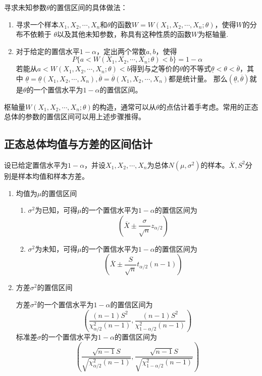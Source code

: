 \begin{theorem}
    寻求未知参数$\theta$的置信区间的具体做法：
    \begin{enumerate}[1°]
        \item 寻求一个样本$X_1,X_2,\cdots,X_n$和$\theta$的函数$W=W(X_1,X_2,\cdots,X_n;\theta)$，使得$W$的分布不依赖于
        $\theta$以及其他未知参数，称具有这种性质的函数$W$为{\heiti 枢轴量}.
        \item 对于给定的置信水平$1-\alpha$，定出两个常数$a,b$，使得
        $$P\{a<W(X_1,X_2,\cdots,X_n;\theta)<b\}=1-\alpha$$
        若能从$a<W(X_1,X_2,\cdots,X_n;\theta)<b$得到与之等价的$\theta$的不等式$\underline{\theta}<\theta<\overline{\theta}$，其中
        $\underline{\theta}=\underline{\theta}(X_1,X_2,\cdots,X_n),\overline{\theta}=\overline{\theta}(X_1,X_2,\cdots,X_n)$都是统计量。
        那么$(\underline{\theta},\overline{\theta})$就是$\theta$的一个置信水平为$1-\alpha$的置信区间。
    \end{enumerate}
    
    枢轴量$W(X_1,X_2,\cdots,X_n;\theta)$的构造，通常可以从$\theta$的点估计着手考虑。常用的正态总体的参数的置信区间可以用上述步骤推得。
\end{theorem}

\subsection{正态总体均值与方差的区间估计}
\begin{theorem}
    设已给定置信水平为$1-\alpha$，并设$X_1,X_2,\cdots,X_n$为总体$N(\mu,\sigma^2)$的样本。$\overline{X},S^2$分别是样本均值和样本方差。
    \begin{enumerate}[1.]
        \item 均值为$\mu$的置信区间
        \begin{enumerate}[(1)]
            \item $\sigma^2$为已知，可得$\mu$的一个置信水平为$1-\alpha$的置信区间为
            $$(\overline{X}\pm \frac{\sigma}{\sqrt{n}}z_{\alpha/2})$$
            \item $\sigma^2$为未知，可得$\mu$的一个置信水平为$1-\alpha$的置信区间为
            $$(\overline{X}\pm \frac{S}{\sqrt{n}}t_{\alpha/2}(n-1))$$
        \end{enumerate}
        \item 方差$\sigma^2$的置信区间
            
        方差$\sigma^2$的一个置信水平为$1-\alpha$的置信区间为
        $$\left(\frac{(n-1)S^2}{\chi ^2_{\alpha/2}(n-1)},\frac{(n-1)S^2}{\chi^2_{1-\alpha/2}(n-1)}\right)$$
        标准差$\sigma$的一个置信水平为$1-\alpha$的置信区间为
        $$\left(\frac{\sqrt{n-1}S}{\sqrt{\chi ^2_{\alpha/2}(n-1)}},\frac{\sqrt{n-1}S}{\sqrt{\chi^2_{1-\alpha/2}(n-1)}}\right)$$
    \end{enumerate}        
\end{theorem}

